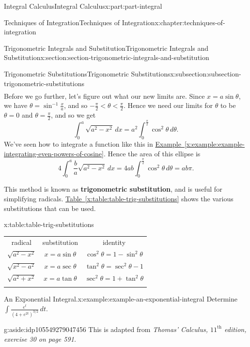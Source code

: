 \documentclass[twoside,10pt,]{book}
\newcommand{\tabularfont}{\relax}
\newcommand{\xreffont}{\relax}
\newcommand{\terminology}[1]{\textbf{#1}}
\numberwithin{equation}{part}
\newcommand{\hrulethin}  {\noalign{\hrule height 0.04em}}
\newcommand{\hrulethick} {\noalign{\hrule height 0.11em}}
\newcommand{\lt}{<}
\begin{document}
\begin{partptx}{Integral Calculus}{}{Integral Calculus}{}{}{x:part:part-integral}
\begin{chapterptx}{Techniques of Integration}{}{Techniques of Integration}{}{}{x:chapter:techniques-of-integration}
\begin{sectionptx}{Trigonometric Integrals and Substitution}{}{Trigonometric Integrals and Substitution}{}{}{x:section:section-trigonometric-integrals-and-substitution}
\begin{subsectionptx}{Trigonometric Substitutions}{}{Trigonometric Substitutions}{}{}{x:subsection:subsection-trigonometric-substitutions}
\begin{align*}
\end{align*}
Before we go further, let's figure out what our new limits are. Since \(x = a\sin\theta\), we have \(\theta = \sin^{-1}\frac{x}{a}\), and so \(-\frac{\pi}{2} \lt \theta \lt \frac{\pi}{2}\). Hence we need our limits for \(\theta\) to be \(\theta = 0\) and \(\theta = \frac{\pi}{2}\), and so we get%
\begin{equation*}
\int_{0}^{a}\sqrt{a^{2} - x^{2}}\,dx = a^{2}\int_{0}^{\frac{\pi}{2}}\cos^{2}\theta\,d\theta.
\end{equation*}
We've seen how to integrate a function like this in \hyperref[x:example:example-integrating-even-powers-of-cosine]{Example~{\xreffont\ref{x:example:example-integrating-even-powers-of-cosine}}}. Hence the area of this ellipse is%
\begin{equation*}
4\int_{0}^{a}\frac{b}{a}\sqrt{a^{2} - x^{2}}\,dx = 4ab\int_{0}^{\frac{\pi}{2}}\cos^{2}\theta\,d\theta = ab\pi.
\end{equation*}
%
\par
This method is known as \terminology{trigonometric substitution}, and is useful for simplifying radicals. \hyperref[x:table:table-trig-substitutions]{Table~{\xreffont\ref{x:table:table-trig-substitutions}}} shows the various substitutions that can be used.%
\begin{tableptx}{\textbf{}}{x:table:table-trig-substitutions}{}%
\centering%
{\tabularfont%
\begin{tabular}{ccc}\hrulethick
radical&substitution&identity\tabularnewline\hrulethin
\(\sqrt{a^{2} - x^{2}}\)&\(x = a\sin\theta\)&\(\cos^{2}\theta = 1-\sin^{2}\theta\)\tabularnewline[0pt]
\(\sqrt{x^{2} - a^{2}}\)&\(x = a\sec\theta\)&\(\tan^{2}\theta = \sec^{2}\theta - 1\)\tabularnewline[0pt]
\(\sqrt{a^{2} + x^{2}}\)&\(x = a\tan\theta\)&\(\sec^{2}\theta = 1+\tan^{2}\theta\)\tabularnewline\hrulethick
\end{tabular}
}%
\end{tableptx}%
\begin{example}{An Exponential Integral.}{x:example:example-an-exponential-integral}%
Determine \(\displaystyle\int\frac{e^{t}}{(4 + e^{2t})^{3/2}}\,dt.\)%
\begin{aside}{}{g:aside:idp105549279047456}%
This is adapted from \emph{Thomas' Calculus, \(11^{\text{th}}\) edition, exercise 30 on page 591.}%
\end{aside}
\par\smallskip%

\end{example}
\end{subsectionptx}
\end{sectionptx}
\end{chapterptx}
\end{partptx}
\end{document}
